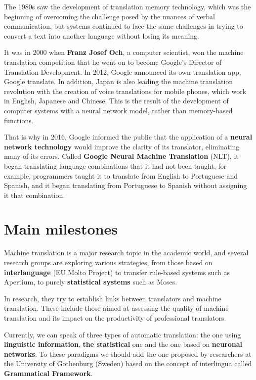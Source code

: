 \documentclass[a4paper]{article}
\theoremstyle{plain}
\theoremstyle{definition}
\begin{document}
    The 1980s saw the development of translation memory technology, which was the beginning of overcoming the challenge posed by the nuances of verbal communication, but systems continued to face the same challenges in trying to convert a text into another language without losing its meaning.\newline
    
    It was in 2000 when \textbf{Franz Josef Och}, a computer scientist, won the machine translation competition that he went on to become Google's Director of Translation Development. In 2012, Google announced its own translation app, Google translate. In addition, Japan is also leading the machine translation revolution with the creation of voice translations for mobile phones, which work in English, Japanese and Chinese. This is the result of the development of computer systems with a neural network model, rather than memory-based functions.\newline
    
    That is why in 2016, Google informed the public that the application of a \textbf{neural network technology }would improve the clarity of its translator, eliminating many of its errors. Called \textbf{Google Neural Machine Translation} (NLT), it began translating language combinations that it had not been taught, for example, programmers taught it to translate from English to Portuguese and Spanish, and it began translating from Portuguese to Spanish without assigning it that combination.
    
    
    

    \section{Main milestones}
	\label{sec:examples}
	Machine translation is a major research topic in the academic world, and several research groups are exploring various strategies, from those based on \textbf{interlanguage} (EU Molto Project) to transfer rule-based systems such as Apertium, to purely \textbf{statistical systems} such as Moses.\newline

    In research, they try to establish links between translators and machine translation. These include those aimed at assessing the quality of machine translation and its impact on the productivity of professional translators.\newline

    Currently, we can speak of three types of automatic translation: the one using \textbf{linguistic information}, \textbf{the statistical} one and the one based on \textbf{neuronal networks}. To these paradigms we should add the one proposed by researchers at the University of Gothenburg (Sweden) based on the concept of interlingua called \textbf{Grammatical Framework}.
\end{document}

